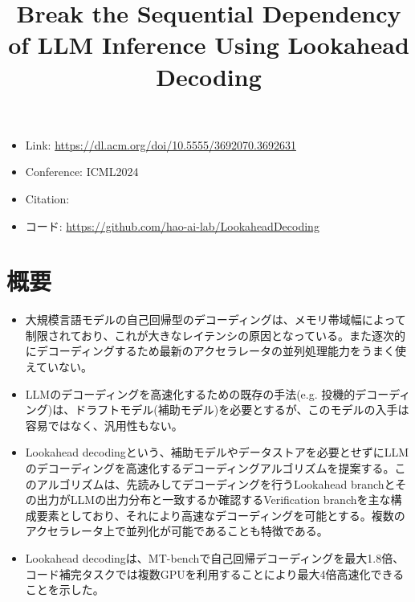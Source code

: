 \documentclass[uplatex]{jsarticle}
\title{Break the Sequential Dependency of LLM Inference Using Lookahead Decoding}
\author{\empty}
\date{\empty}
\theoremstyle{remark}
\begin{document}
\maketitle

\begin{itemize}
    \item Link: \url{https://dl.acm.org/doi/10.5555/3692070.3692631}
    \item Conference: ICML2024
    \item Citation: \cite{lookahead_decoding}
    \item コード: \url{https://github.com/hao-ai-lab/LookaheadDecoding}
\end{itemize}

\section{概要}
\begin{itemize}
  \item 大規模言語モデルの自己回帰型のデコーディングは、メモリ帯域幅によって制限されており、これが大きなレイテンシの原因となっている。また逐次的にデコーディングするため最新のアクセラレータの並列処理能力をうまく使えていない。
  \item LLMのデコーディングを高速化するための既存の手法(e.g. 投機的デコーディング)は、ドラフトモデル(補助モデル)を必要とするが、このモデルの入手は容易ではなく、汎用性もない。
  \item Lookahead decodingという、補助モデルやデータストアを必要とせずにLLMのデコーディングを高速化するデコーディングアルゴリズムを提案する。このアルゴリズムは、先読みしてデコーディングを行うLookahead branchとその出力がLLMの出力分布と一致するか確認するVerification branchを主な構成要素としており、それにより高速なデコーディングを可能とする。複数のアクセラレータ上で並列化が可能であることも特徴である。
  \item Lookahead decodingは、MT-benchで自己回帰デコーディングを最大1.8倍、コード補完タスクでは複数GPUを利用することにより最大4倍高速化できることを示した。
\end{itemize}

\end{document}
